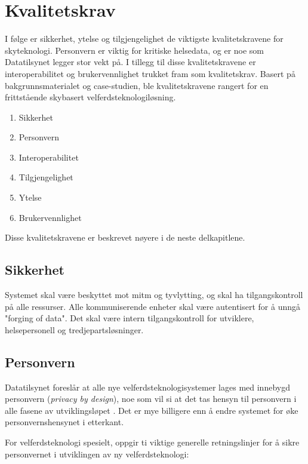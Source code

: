 
\section{Kvalitetskrav}

I følge \citet{softarch} er sikkerhet, ytelse og tilgjengelighet de viktigste kvalitetskravene for skyteknologi.
Personvern er viktig for kritiske helsedata, og er noe som Datatilsynet legger stor vekt på. I tillegg til disse kvalitetskravene
er interoperabilitet og brukervennlighet trukket fram som kvalitetskrav. Basert på bakgrunnsmaterialet og case-studien,
ble kvalitetskravene rangert for en frittstående skybasert velferdsteknologiløsning.

\begin{enumerate}
    \item Sikkerhet
    \item Personvern
    \item Interoperabilitet
    \item Tilgjengelighet
    \item Ytelse
    \item Brukervennlighet
\end{enumerate}

Disse kvalitetskravene er beskrevet nøyere i de neste delkapitlene.

\subsection{Sikkerhet}
Systemet skal være beskyttet mot \gls{mitm} og tyvlytting, og skal ha tilgangskontroll på alle ressurser.
Alle kommuniserende enheter skal være autentisert for å unngå "forging of data". %
Det skal være intern tilgangskontroll for utviklere, helsepersonell og tredjepartsløsninger.

\subsection{Personvern}
Datatilsynet foreslår at alle nye velferdsteknologisystemer lages med innebygd personvern (\textit{privacy by design}),
noe som vil si at det tas hensyn til personvern i alle fasene av utviklingsløpet \citep{datatilsynet_privacy}. Det er mye billigere
enn å endre systemet for øke personvernshensynet i etterkant.

For velferdsteknologi spesielt, oppgir \citet{datatilsynet_welfare} ti viktige generelle retningslinjer for å sikre personvernet
i utviklingen av ny velferdsteknologi:

